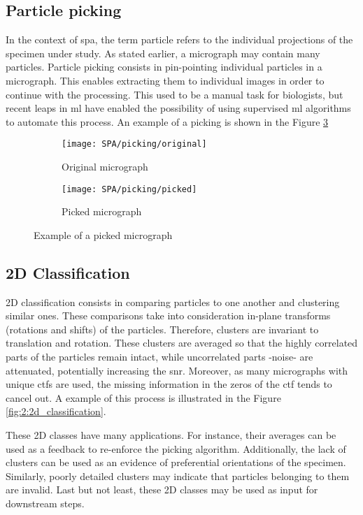 \documentclass[../main.tex]{subfiles}
\begin{document}
\subsection{Particle picking}
In the context of \gls{spa}, the term particle refers to the individual projections of the specimen under study. As stated earlier, a micrograph may contain many particles. Particle picking consists in pin-pointing individual particles in a micrograph. This enables extracting them to individual images in order to continue with the processing. This used to be a manual task for biologists, but recent leaps in \gls{ml} have enabled the possibility of using supervised \gls{ml} algorithms to automate this process. An example of a picking is shown in the Figure \ref{fig:2:picking}

\begin{figure}[htbp]
    \centering
    \begin{subfigure}[b]{0.45\textwidth}
         \centering
         \texttt{[image: SPA/picking/original]}
         \caption{Original micrograph}
         \label{fig:2:picking:original}
    \end{subfigure}
    \begin{subfigure}[b]{0.45\textwidth}
         \centering
         \texttt{[image: SPA/picking/picked]}
         \caption{Picked micrograph}
         \label{fig:2:picking:picked}
    \end{subfigure}
    \caption{Example of a picked micrograph}
    \label{fig:2:picking}
\end{figure}

\subsection{2D Classification}
2D classification consists in comparing particles to one another and clustering similar ones. These comparisons take into consideration in-plane transforms (rotations and shifts) of the particles. Therefore, clusters are invariant to translation and rotation. These clusters are averaged so that the highly correlated parts of the particles remain intact, while uncorrelated parts -noise- are attenuated, potentially increasing the \gls{snr}. Moreover, as many micrographs with unique \glspl{ctf} are used, the missing information in the zeros of the \gls{ctf} tends to cancel out. A example of this process is illustrated in the Figure \ref{fig:2:2d_classification}.

These 2D classes have many applications. For instance, their averages can be used as a feedback to re-enforce the picking algorithm. Additionally, the lack of clusters can be used as an evidence of preferential orientations of the specimen. Similarly, poorly detailed clusters may indicate that particles belonging to them are invalid. Last but not least, these 2D classes may be used as input for downstream steps.
\end{document}
